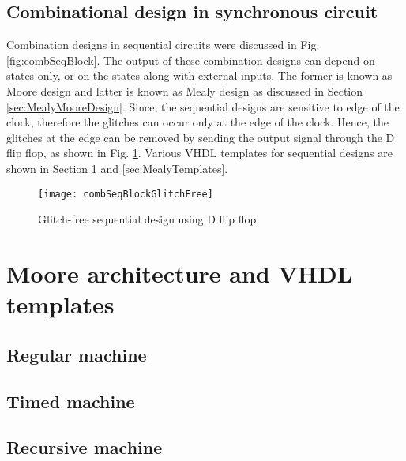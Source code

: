\subsection{Combinational design in synchronous circuit}\label{sec:glitchInsSync}
Combination designs in sequential circuits were discussed in Fig. \ref{fig:combSeqBlock}. The output of these combination designs can depend on states only, or on the states along with external inputs. The former is known as Moore design and latter is known as Mealy design as discussed in Section \ref{sec:MealyMooreDesign}. Since, the sequential designs are sensitive to edge of the clock, therefore the glitches can occur only at the edge of the clock. Hence, the glitches at the edge can be removed by sending the output signal through the D flip flop, as shown in Fig. \ref{fig:combSeqBlockGlitchFree}. Various VHDL templates for sequential designs are shown in Section \ref{sec:MooreTemplates} and \ref{sec:MealyTemplates}. 

\begin{figure}[!h]
	\centering
	\texttt{[image: combSeqBlockGlitchFree]}
	\caption{Glitch-free sequential design using D flip flop}
	\label{fig:combSeqBlockGlitchFree}
\end{figure}


\section{Moore architecture and VHDL templates} \label{sec:MooreTemplates}
\subsection{Regular machine}




\subsection{Timed machine}
\subsection{Recursive machine}


